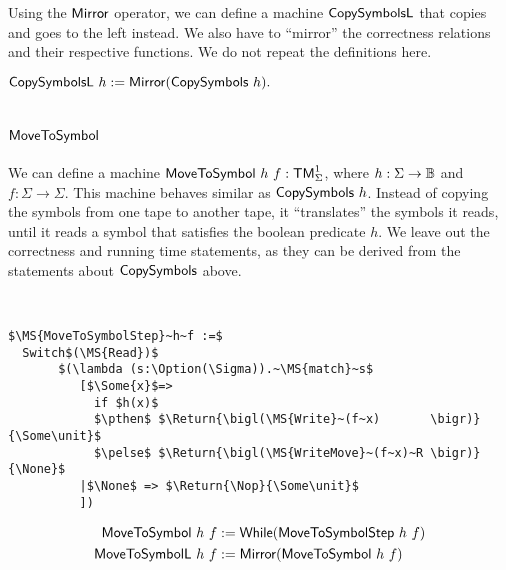 Using the $\mathsf{Mirror}$ operator, we can define a machine $\MS{CopySymbolsL}$ that copies and goes to the left instead.  We also have to ``mirror''
the correctness relations and their respective functions.  We do not repeat the definitions here.
\begin{definition}[$\MS{CopySymbolsL}$][CopySymbols_L]
  $\mathsf{CopySymbolsL}~h := \mathsf{Mirror}(\mathsf{CopySymbols}~h).$
\end{definition}

\section{$\MS{MoveToSymbol}$}
\label{sec:MoveToSymbol}
%

\enlargethispage{0.5cm}

We can define a machine $\mathsf{MoveToSymbol}~h~f : \mathsf{TM}_\Sigma^1$, where $h:\Sigma\rightarrow\mathbb{B}$ and $f:\Sigma\to\Sigma$.  This machine behaves similar as
$\mathsf{CopySymbols}~h$.  Instead of copying the symbols from one tape to another tape, it ``translates'' the symbols it reads, until it reads a symbol
that satisfies the boolean predicate $h$.  We leave out the correctness and running time statements, as they can be derived from the statements about
$\mathsf{CopySymbols}$ above.

\begin{definition}[$\MS{MoveToSymbol}$][MoveToSymbol]
  ~
\begin{lstlisting}[style=semicoqstyle]
$\MS{MoveToSymbolStep}~h~f :=$
  Switch$(\MS{Read})$
       $(\lambda (s:\Option(\Sigma)).~\MS{match}~s$
          [$\Some{x}$=> 
            if $h(x)$
            $\pthen$ $\Return{\bigl(\MS{Write}~(f~x)       \bigr)}{\Some\unit}$ 
            $\pelse$ $\Return{\bigl(\MS{WriteMove}~(f~x)~R \bigr)}{\None}$ 
          |$\None$ => $\Return{\Nop}{\Some\unit}$ 
          ])
\end{lstlisting}
  \begin{align*}
    \mathsf{MoveToSymbol }~h~f &:= \mathsf{While}(\mathsf{MoveToSymbolStep}~h~f) \\
    \mathsf{MoveToSymbolL}~h~f &:= \mathsf{Mirror}(\mathsf{MoveToSymbol}~h~f)
  \end{align*}
\end{definition}



